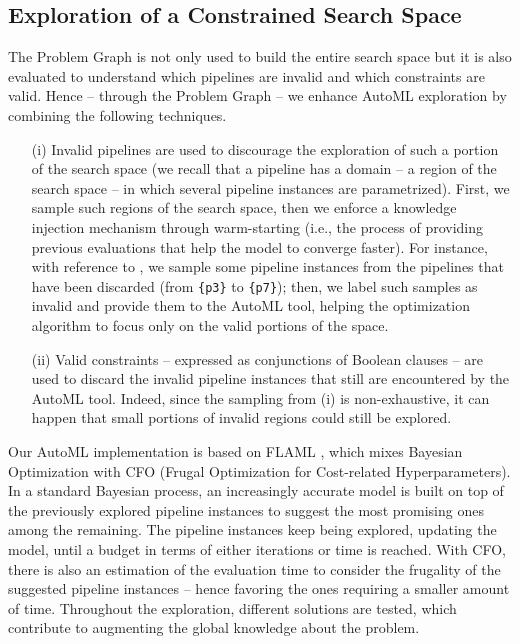 \subsection{Exploration of a Constrained Search Space}\label{subsec:constrained_automl}

The Problem Graph is not only used to build the entire search space but it is also evaluated to understand which pipelines are invalid and which constraints are valid.
Hence -- through the Problem Graph -- we enhance AutoML exploration by combining the following techniques.
\begin{itemize}
    \item[(i)] Invalid pipelines are used to discourage the exploration of such a portion of the search space (we recall that a pipeline has a domain -- a region of the search space -- in which several pipeline instances are parametrized).
    First, we sample such regions of the search space, then we enforce a knowledge injection mechanism through warm-starting (i.e., the process of providing previous evaluations that help the model to converge faster).
    For instance, with reference to , we sample some pipeline instances from the pipelines that have been discarded (from \texttt{\{p3\}} to \texttt{\{p7\}});
    then, we label such samples as invalid and provide them to the AutoML tool, helping the optimization algorithm to focus only on the valid portions of the space.
    \item[(ii)] Valid constraints -- expressed as conjunctions of Boolean clauses -- are used to discard the invalid pipeline instances that still are encountered by the AutoML tool.
    Indeed, since the sampling from (i) is non-exhaustive, it can happen that small portions of invalid regions could still be explored.
\end{itemize}

Our AutoML implementation is based on FLAML \cite{wang2021flaml}, which mixes Bayesian Optimization with CFO (Frugal Optimization for Cost-related Hyperparameters).
In a standard Bayesian process, an increasingly accurate model is built on top of the previously explored pipeline instances to suggest the most promising ones among the remaining.
The pipeline instances keep being explored, updating the model, until a budget in terms of either iterations or time is reached.
With CFO, there is also an estimation of the evaluation time to consider the frugality of the suggested pipeline instances -- hence favoring the ones requiring a smaller amount of time.
Throughout the exploration, different solutions are tested, which contribute to augmenting the global knowledge about the problem.

